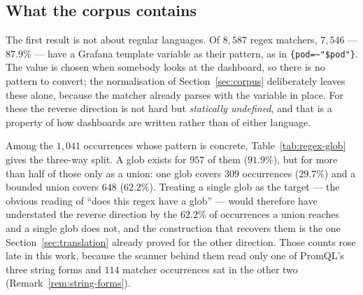 \subsection{What the corpus contains}
\label{sec:glob-corpus}

\begin{table}[htbp]\centering\footnotesize

\caption{Every \texttt{=\textasciitilde{}} and \texttt{!\textasciitilde{}} matcher in the
PromQL half of the corpus. Shares are of the concrete regular expressions; the
template-valued row is counted but not classified, because the pattern is not in the query
text.}
\label{tab:regex-glob}
\end{table}

The first result is not about regular languages. Of $8{,}587$ regex matchers,
$7{,}546$ --- $87.9\%$ --- have a Grafana template variable as their pattern, as in
\texttt{\{pod=\textasciitilde{}"\$pod"\}}. The value is chosen when somebody looks at the
dashboard, so there is no pattern to convert; the normalisation of
Section~\ref{sec:corpus} deliberately leaves these alone, because the matcher already
parses with the variable in place. For these the reverse direction is not hard but
\emph{statically undefined}, and that is a property of how dashboards are written rather
than of either language.

Among the $1{,}041$ occurrences whose pattern is concrete, Table~\ref{tab:regex-glob}
gives the three-way split. A glob exists for $957$ of them ($91.9\%$), but for more than
half of those only as a union: one glob covers $309$ occurrences ($29.7\%$) and a bounded
union covers $648$ ($62.2\%$). Treating a single glob as the target --- the obvious
reading of ``does this regex have a glob'' --- would therefore have understated the
reverse direction by the $62.2\%$ of occurrences a union reaches and a single glob does
not, and the construction that recovers them is the one
Section~\ref{sec:translation} already proved for the other direction. Those counts rose late in this work, because the scanner behind them read
only one of PromQL's three string forms and $114$ matcher occurrences sat in the other
two (Remark~\ref{rem:string-forms}).

\iffull\fi

\begin{table}[htbp]\centering\footnotesize

\caption{The constructs behind the $84$ refused occurrences. The first is ruled out as
a single glob by Corollary~\ref{cor:no-glob} and the second by
Corollary~\ref{cor:absent-char}, which is the distinction the text after this table
draws; only the second is also beyond a bounded union of globs.}
\label{tab:regex-glob-reasons}
\end{table}
\iffull\fi

